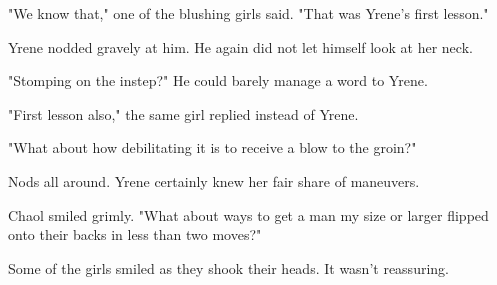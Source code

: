 "We know that," one of the blushing girls said. "That was Yrene's first lesson."

Yrene nodded gravely at him. He again did not let himself look at her neck.

"Stomping on the instep?" He could barely manage a word to Yrene.

"First lesson also," the same girl replied instead of Yrene.

"What about how debilitating it is to receive a blow to the groin?"

Nods all around. Yrene certainly knew her fair share of maneuvers.

Chaol smiled grimly. "What about ways to get a man my size or larger flipped onto their backs in less than two moves?"

Some of the girls smiled as they shook their heads. It wasn't reassuring.

